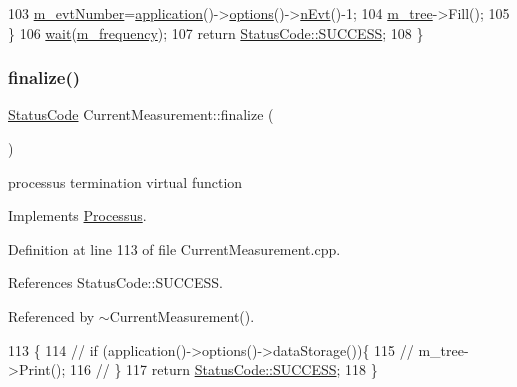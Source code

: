 \begin{DoxyCode}
103     \hyperlink{classCurrentMeasurement_a6e01f96c84aec986de9a9f7393ccb2c6}{m\_evtNumber}=\hyperlink{Tools_8h_a27885a3c35afe79029fb830f32f66458}{application}()->\hyperlink{classApplication_ada7cc0e8db586985f1435aee0c79f47d}{options}()->\hyperlink{classOptions_ad769b256263a4ac24dd6f989ae724ab7}{nEvt}()-1;
104     \hyperlink{classCurrentMeasurement_a559823413932b393dedfc62d42268d93}{m\_tree}->Fill();
105   \}
106   \hyperlink{Tools_8h_a74d6a3fc8194eaac3e1f888db0542be9}{wait}(\hyperlink{classCurrentMeasurement_a66e12903825632c0434e3b7cf929a960}{m\_frequency});
107   \textcolor{keywordflow}{return} \hyperlink{classStatusCode_a6f565cbeadc76d14c72f047e5e85eb4badd0da38d3ba0d922efd1f4619bc37ad8}{StatusCode::SUCCESS};
108 \}
\end{DoxyCode}
\mbox{\label{classCurrentMeasurement_af87fa329a11212c10e878568bcecaeb3}} 
\subsubsection{\texorpdfstring{finalize()}{finalize()}}
{\footnotesize\ttfamily \hyperlink{classStatusCode}{Status\+Code} Current\+Measurement\+::finalize (\begin{DoxyParamCaption}{ }\end{DoxyParamCaption})\hspace{0.3cm}{\ttfamily [virtual]}}

processus termination virtual function 

Implements \hyperlink{classProcessus_aba93d691f031bdb18ae4b8afb1b2e856}{Processus}.



Definition at line 113 of file Current\+Measurement.\+cpp.



References Status\+Code\+::\+S\+U\+C\+C\+E\+SS.



Referenced by $\sim$\+Current\+Measurement().


\begin{DoxyCode}
113                                           \{
114   \textcolor{comment}{// if (application()->options()->dataStorage())\{}
115   \textcolor{comment}{//   m\_tree->Print();}
116   \textcolor{comment}{// \}}
117   \textcolor{keywordflow}{return} \hyperlink{classStatusCode_a6f565cbeadc76d14c72f047e5e85eb4badd0da38d3ba0d922efd1f4619bc37ad8}{StatusCode::SUCCESS};
118 \}
\end{DoxyCode}
\mbox{\label{classCurrentMeasurement_ae7c60d0b14808000df5f1d633e0ca990}} 
